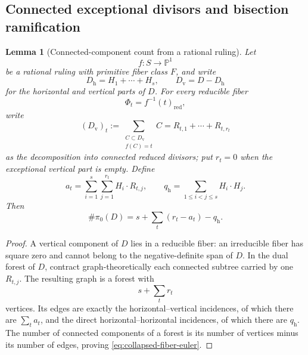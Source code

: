 \documentclass[11pt,reqno]{amsart}
\newtheorem{lemma}[lemma]{Lemma}
\theoremstyle{definition}
\theoremstyle{remark}
\newcommand{\PP}{\mathbb P}
\numberwithin{equation}{section}
\begin{document}
\subsection{Connected exceptional divisors and bisection ramification}
\begin{lemma}[Connected-component count from a rational ruling]
\label{lem:forest-count}
Let
\[
  f:S\longrightarrow\PP^1
\]
be a rational ruling with primitive fiber class $F$, and write
\[
  D_{\mathrm h}=H_1+\cdots+H_s,
  \qquad
  D_{\mathrm v}=D-D_{\mathrm h}
\]
for the horizontal and vertical parts of $D$.  For every reducible
fiber
\[
  \Phi_t=f^{-1}(t)_{\mathrm{red}},
\]
write
\[
  (D_{\mathrm v})_t
   :=\sum_{\substack{C\subset D_{\mathrm v}\\ f(C)=t}}C
   =R_{t,1}+\cdots+R_{t,r_t}
\]
as the decomposition into connected reduced divisors; put $r_t=0$ when
the exceptional vertical part is empty.  Define
\[
  a_t
   =\sum_{i=1}^s\sum_{j=1}^{r_t}H_i\cdot R_{t,j},
  \qquad
  q_{\mathrm h}
   =\sum_{1\le i<j\le s}H_i\cdot H_j.
\]
Then
\begin{equation}\label{eq:collapsed-fiber-euler}
  \#\pi_0(D)
   =s+\sum_t(r_t-a_t)-q_{\mathrm h}.
\end{equation}
\end{lemma}

\begin{proof}
A vertical component of $D$ lies in a reducible fiber: an irreducible
fiber has square zero and cannot belong to the negative-definite
span of $D$.  In the dual forest of $D$, contract graph-theoretically
each connected subtree carried by one $R_{t,j}$.  The resulting graph is
a forest with
\[
  s+\sum_t r_t
\]
vertices.  Its edges are exactly the horizontal--vertical incidences,
of which there are $\sum_ta_t$, and the direct
horizontal--horizontal incidences, of which there are $q_{\mathrm h}$.
The number of connected components of a forest is its number of vertices
minus its number of edges, proving
\eqref{eq:collapsed-fiber-euler}.
\end{proof}
\end{document}
